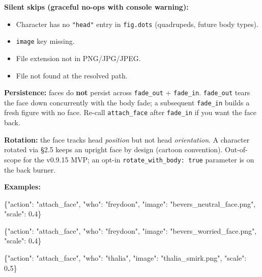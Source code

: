 \documentclass[
  12pt,
  letterpaper,
]{book}
\newenvironment{Shaded}{}{}
\newcommand{\DataTypeTok}[1]{\textcolor[rgb]{0.56,0.13,0.00}{#1}}
\newcommand{\DecValTok}[1]{\textcolor[rgb]{0.25,0.63,0.44}{#1}}
\newcommand{\ErrorTok}[1]{\textcolor[rgb]{1.00,0.00,0.00}{\textbf{#1}}}
\newcommand{\FunctionTok}[1]{\textcolor[rgb]{0.02,0.16,0.49}{#1}}
\newcommand{\StringTok}[1]{\textcolor[rgb]{0.25,0.44,0.63}{#1}}
\providecommand{\tightlist}{%
  \setlength{\itemsep}{0pt}\setlength{\parskip}{0pt}}
\begin{document}
\textbf{Silent skips (graceful no-ops with console warning):}

\begin{itemize}
\tightlist
\item
  Character has no \texttt{"head"} entry in \texttt{fig.dots}
  (quadrupeds, future body types).
\item
  \texttt{image} key missing.
\item
  File extension not in PNG/JPG/JPEG.
\item
  File not found at the resolved path.
\end{itemize}

\textbf{Persistence:} faces do \textbf{not} persist across
\texttt{fade\_out} + \texttt{fade\_in}. \texttt{fade\_out} tears the
face down concurrently with the body fade; a subsequent
\texttt{fade\_in} builds a fresh figure with no face. Re-call
\texttt{attach\_face} after \texttt{fade\_in} if you want the face back.

\textbf{Rotation:} the face tracks head \emph{position} but not head
\emph{orientation}. A character rotated via §2.5 keeps an upright face
by design (cartoon convention). Out-of-scope for the v0.9.15 MVP; an
opt-in \texttt{rotate\_with\_body:\ true} parameter is on the back
burner.

\textbf{Examples:}

\begin{Shaded}
\begin{Highlighting}[]
\FunctionTok{\{}\DataTypeTok{"action"}\FunctionTok{:} \StringTok{"attach\_face"}\FunctionTok{,} \DataTypeTok{"who"}\FunctionTok{:} \StringTok{"freydoon"}\FunctionTok{,}
 \DataTypeTok{"image"}\FunctionTok{:} \StringTok{"bevers\_neutral\_face.png"}\FunctionTok{,} \DataTypeTok{"scale"}\FunctionTok{:} \DecValTok{0}\ErrorTok{.}\DecValTok{4}\FunctionTok{\}}

\FunctionTok{\{}\DataTypeTok{"action"}\FunctionTok{:} \StringTok{"attach\_face"}\FunctionTok{,} \DataTypeTok{"who"}\FunctionTok{:} \StringTok{"freydoon"}\FunctionTok{,}
 \DataTypeTok{"image"}\FunctionTok{:} \StringTok{"bevers\_worried\_face.png"}\FunctionTok{,} \DataTypeTok{"scale"}\FunctionTok{:} \DecValTok{0}\ErrorTok{.}\DecValTok{4}\FunctionTok{\}}

\FunctionTok{\{}\DataTypeTok{"action"}\FunctionTok{:} \StringTok{"attach\_face"}\FunctionTok{,} \DataTypeTok{"who"}\FunctionTok{:} \StringTok{"thalia"}\FunctionTok{,}
 \DataTypeTok{"image"}\FunctionTok{:} \StringTok{"thalia\_smirk.png"}\FunctionTok{,} \DataTypeTok{"scale"}\FunctionTok{:} \DecValTok{0}\ErrorTok{.}\DecValTok{5}\FunctionTok{\}}
\end{Highlighting}
\end{Shaded}
\end{document}

